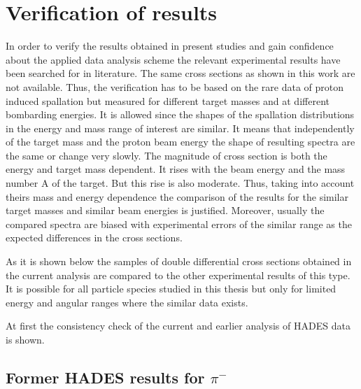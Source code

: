 

\section{\label{result_verification} Verification of results}

In order to verify the results obtained in present studies and gain  confidence about the applied data analysis scheme the relevant experimental results have been searched for in literature. The same cross sections as shown in this work are not available. Thus, the verification has to be based on the rare data of proton induced spallation but measured for different target masses and at different bombarding energies.  
It is allowed since the shapes of the spallation distributions 
in the energy and mass range of interest are similar.
It means that independently of the target mass and the proton beam energy the shape of resulting spectra are the same or change very slowly. 
The magnitude of cross section is both the energy and target mass dependent. It rises with the beam energy
and the mass number A of the target. 
But this rise is also moderate. Thus, taking into account theirs mass and energy dependence the comparison of the results 
for the similar target masses and similar beam energies is justified. 
Moreover, usually the compared spectra are biased with experimental errors of the similar range as the expected differences in the
cross sections.

As it is shown below the samples of double differential cross sections obtained in the current analysis are compared to the
other experimental results of this type. It is possible for all 
particle species studied in this thesis but only for limited 
energy and angular ranges where the similar data exists. 

At first the consistency check of the current and earlier analysis of HADES data is shown.

\subsection{\label{consistency_pim} Former HADES results for $\pi^{-}$}

